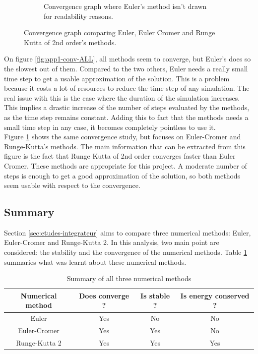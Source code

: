 \documentclass[a4paper,12pt,twoside]{article}
\begin{document}
\begin{figure}[h]
\begin{subfigure}[t]{0.45\textwidth}
	\caption{Convergence graph where Euler's method isn't drawn for readability reasons.}
	\label{fig:app1-conv-noEuler}
\end{subfigure}
\caption{Convergence graph comparing Euler, Euler Cromer and Runge Kutta of 2nd order's methods.}
\label{fig:app1-conv}
\end{figure}

On figure \ref{fig:app1-conv-ALL}, all methods seem to converge, but Euler's does so the slowest out of them.
Compared to the two others, Euler needs a really small time step to get a usable approximation of the solution.
This is a problem because it costs a lot of resources to reduce the time step of any simulation.
The real issue with this is the case where the duration of the simulation increases.
This implies a drastic increase of the number of steps evaluated by the methods, as the time step remains constant.
Adding this to fact that the methods needs a small time step in any case, it becomes completely pointless to use it.\\

Figure \ref{fig:app1-conv-noEuler} shows the same convergence study, but focuses on Euler-Cromer and Runge-Kutta's methods.
The main information that can be extracted from this figure is the fact that Runge Kutta of 2nd order converges faster than Euler Cromer.
These methods are appropriate for this project.
A moderate number of steps is enough to get a good approximation of the solution, so both methods seem usable with respect to the convergence.\\

\subsection{Summary}
Section \ref{sec:etudes-integrateur} aims to compare three numerical methods: Euler, Euler-Cromer and Runge-Kutta 2.
In this analysis, two main point are considered: the stability and the convergence of the numerical methods.
Table \ref{tab:comparaison-integrateur} summaries what was learnt about these numerical methods.\\

\begin{table}[h]
\centering
\begin{tabular}{c | c | c | c}
	Numerical method & Does converge ? & Is stable ? & Is energy conserved ? \\
	\hline
	Euler & Yes & No & No\\
	Euler-Cromer & Yes & Yes & No \\
	Runge-Kutta 2 & Yes & Yes & Yes\\
\end{tabular}
\caption{Summary of all three numerical methods}
\label{tab:comparaison-integrateur}
\end{table}
\end{document}
